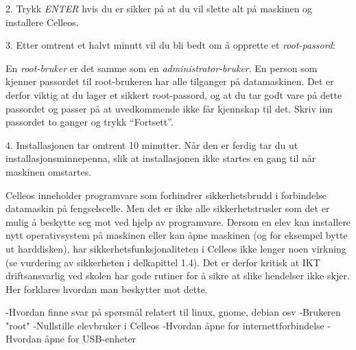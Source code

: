 \item{2.} Trykk {\it ENTER} hvis du er sikker p\aa{} at du vil slette alt p\aa{} maskinen og installere Celleos.
\item{3.} Etter omtrent et halvt minutt vil du bli bedt om \aa{} opprette et {\it root-passord}:
\medskip
{}

\item{} En {\it root-bruker} er det samme som en {\it administrator-bruker}. En person som kjenner passordet til root-brukeren har alle tilganger p\aa{} datamaskinen. Det er derfor viktig at du lager et sikkert root-passord, og at du tar godt vare p\aa{} dette passordet og passer p\aa{} at uvedkommende ikke f\aa r kjennskap til det. Skriv inn passordet to ganger og trykk ``Fortsett''.
\item{4.} Installasjonen tar omtrent 10 minutter. N\aa r den er ferdig tar du ut installasjonsminnepenna, slik at installasjonen ikke startes en gang til n\aa r maskinen omstartes.

\vfill\eject
\topglue 1pc

Celleos inneholder programvare som forhindrer sikkerhetsbrudd i forbindelse datamaskin p\aa{} fengselscelle. Men det er ikke alle sikkerhetstrusler som det er mulig \aa{} beskytte seg mot ved hjelp av programvare. Dersom en elev kan installere nytt operativsystem p\aa{} maskinen eller kan \aa pne maskinen (og for eksempel bytte ut harddisken), har sikkerhetsfunksjonaliteten i Celleos ikke lenger noen virkning (se vurdering av sikkerheten i delkapittel 1.4). Det er derfor kritisk at IKT driftsansvarlig ved skolen har gode rutiner for \aa{} sikre at slike hendelser ikke skjer. Her forklares hvordan man beskytter mot dette.





-Hvordan finne svar p\aa{} sp\o rsm\aa l relatert til linux, gnome, debian osv
-Brukeren "root"
-Nullstille elevbruker i Celleos
-Hvordan \aa pne for internettforbindelse
-Hvordan \aa pne for USB-enheter

\vfill\eject\bye
